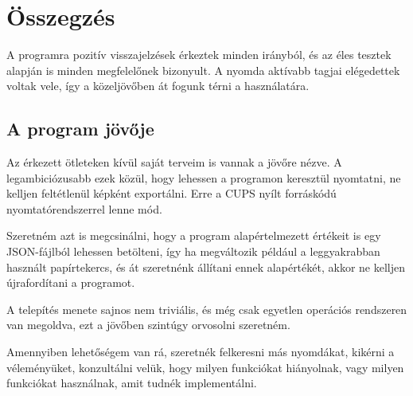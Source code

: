 \chapter{Összegzés}

A programra pozitív visszajelzések érkeztek minden irányból, és az éles tesztek alapján is minden megfelelőnek bizonyult. A nyomda aktívabb tagjai elégedettek voltak vele, így a közeljövőben át fogunk térni a használatára.

\section{A program jövője}

Az érkezett ötleteken kívül saját terveim is vannak a jövőre nézve. A legambiciózusabb ezek közül, hogy lehessen a programon keresztül nyomtatni, ne kelljen feltétlenül képként exportálni. Erre a CUPS nyílt forráskódú nyomtatórendszerrel lenne mód.

Szeretném azt is megcsinálni, hogy a program alapértelmezett értékeit is egy JSON-fájlból lehessen betölteni, így ha megváltozik például a leggyakrabban használt papírtekercs, és át szeretnénk állítani ennek alapértékét, akkor ne kelljen újrafordítani a programot. 

A telepítés menete sajnos nem triviális, és még csak egyetlen operációs rendszeren van megoldva, ezt a jövőben szintúgy orvosolni szeretném.

Amennyiben lehetőségem van rá, szeretnék felkeresni más nyomdákat, kikérni a véleményüket, konzultálni velük, hogy milyen funkciókat hiányolnak, vagy milyen funkciókat használnak, amit tudnék implementálni.

